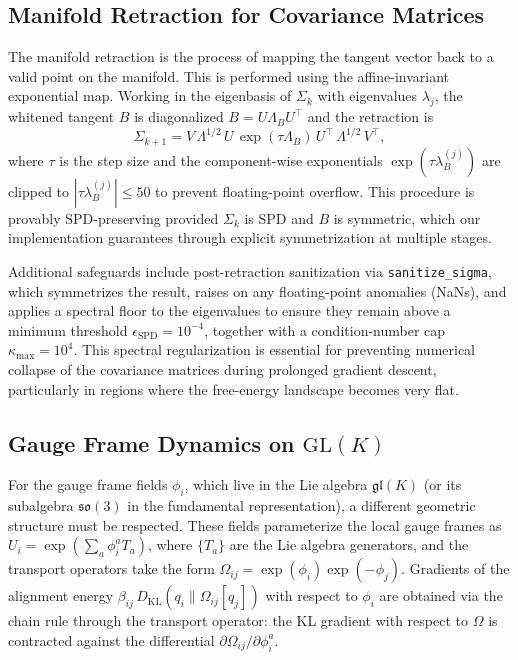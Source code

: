 \documentclass[twoside,11pt]{article}
\begin{document}
\subsection{Manifold Retraction for Covariance Matrices}\label{sec:retraction}
The manifold retraction is the process of mapping the tangent vector back to a valid point on the manifold. This is performed using the affine-invariant exponential map. Working in the eigenbasis of $\Sigma_k$ with eigenvalues $\lambda_j$, the whitened tangent $B$ is diagonalized $B = U\Lambda_B U^\top$ and the retraction is
\begin{equation}
\Sigma_{k+1} = V\,\Lambda^{1/2}\, U\, \exp(\tau \Lambda_B)\, U^\top\, \Lambda^{1/2}\, V^\top,
\end{equation}
where $\tau$ is the step size and the component-wise exponentials $\exp(\tau \lambda_B^{(j)})$ are clipped to $|\tau \lambda_B^{(j)}| \le 50$ to prevent floating-point overflow.  This procedure is provably SPD-preserving provided $\Sigma_k$ is SPD and $B$ is symmetric, which our implementation guarantees through explicit symmetrization at multiple stages.

Additional safeguards include post-retraction sanitization via
\texttt{sanitize\_sigma}, which symmetrizes the result, raises on any
floating-point anomalies (NaNs), and applies a spectral floor to the
eigenvalues to ensure they remain above a minimum threshold
$\epsilon_{\mathrm{SPD}} = 10^{-4}$, together with a condition-number cap
$\kappa_{\max} = 10^{4}$.  This spectral regularization is essential for
preventing numerical collapse of the covariance matrices during prolonged
gradient descent, particularly in regions where the free-energy landscape
becomes very flat.

\subsection{Gauge Frame Dynamics on $\mathrm{GL}(K)$}
For the gauge frame fields $\phi_i$, which live in the Lie algebra $\mathfrak{gl}(K)$ (or its subalgebra $\mathfrak{so}(3)$ in the fundamental representation), a different geometric structure must be respected. These fields parameterize the local gauge frames as $U_i = \exp(\sum_a \phi_i^a T_a)$, where $\{T_a\}$ are the Lie algebra generators, and the transport operators take the form $\Omega_{ij} = \exp(\phi_i)\exp(-\phi_j)$.  Gradients of the alignment energy $\beta_{ij}\,D_{\mathrm{KL}}(q_i \| \Omega_{ij}[q_j])$ with respect to $\phi_i$ are obtained via the chain rule through the transport operator: the KL gradient with respect to $\Omega$ is contracted against the differential $\partial\Omega_{ij}/\partial\phi_i^a$.
\end{document}
